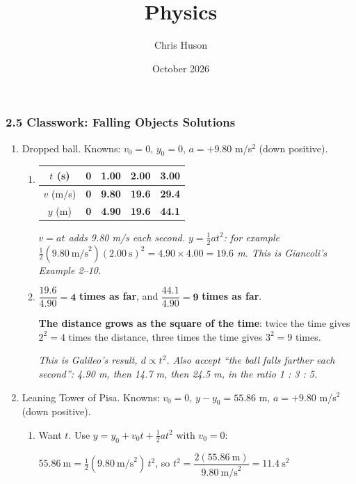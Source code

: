 \documentclass[12pt, twoside]{article}
\title{Physics}
\author{Chris Huson}
\date{October 2026}
\begin{document}
\subsubsection*{2.5 Classwork: Falling Objects Solutions}

\begin{enumerate}[itemsep=0.5cm]

\item Dropped ball. Knowns: $v_0 = 0$, $y_0 = 0$, $a = +9.80$ m/s$^2$ (down
  positive).
  \begin{enumerate}[itemsep=0.3cm]
    \item \renewcommand{\arraystretch}{1.4}
      \begin{tabular}[t]{| c | c | c | c | c |}
        \hline
        $t$ (s) & 0 & 1.00 & 2.00 & 3.00 \\ \hline
        $v$ (m/s) & \textbf{0} & \textbf{9.80} & \textbf{19.6} & \textbf{29.4}
          \\ \hline
        $y$ (m) & \textbf{0} & \textbf{4.90} & \textbf{19.6} & \textbf{44.1}
          \\ \hline
      \end{tabular}

      \emph{$v = at$ adds 9.80 m/s each second. $y = \frac{1}{2}at^2$: for example
      $\frac{1}{2}(9.80~\text{m/s}^2)(2.00~\text{s})^2 = 4.90 \times 4.00 = 19.6$ m.
      This is Giancoli's Example 2--10.}
    \item $\dfrac{19.6}{4.90} = \mathbf{4}$ \textbf{times as far}, and
      $\dfrac{44.1}{4.90} = \mathbf{9}$ \textbf{times as far}.

      \textbf{The distance grows as the square of the time}: twice the time gives
      $2^2 = 4$ times the distance, three times the time gives $3^2 = 9$ times.

      \emph{This is Galileo's result, $d \propto t^2$. Also accept ``the ball falls
      farther each second'': 4.90 m, then 14.7 m, then 24.5 m, in the ratio
      1 : 3 : 5.}
  \end{enumerate}

\item Leaning Tower of Pisa. Knowns: $v_0 = 0$, $y - y_0 = 55.86$ m,
  $a = +9.80$ m/s$^2$ (down positive).
  \begin{enumerate}[itemsep=0.3cm]
    \item Want $t$. Use $y = y_0 + v_0 t + \frac{1}{2}at^2$ with $v_0 = 0$:

      $55.86~\text{m} = \tfrac{1}{2}(9.80~\text{m/s}^2)\,t^2$, \quad so
      $t^2 = \dfrac{2(55.86~\text{m})}{9.80~\text{m/s}^2} = 11.4~\text{s}^2$


\end{enumerate}
\end{enumerate}
\end{document}

